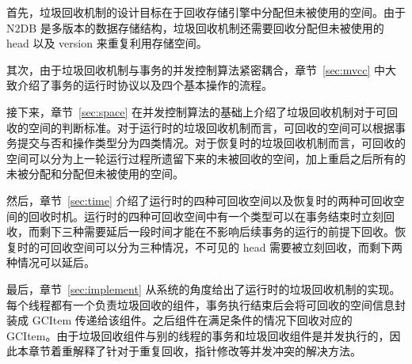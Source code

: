 首先，垃圾回收机制的设计目标在于回收存储引擎中分配但未被使用的空间。由于 N2DB 是多版本的数据存储结构，垃圾回收机制还需要回收分配但未被使用的 head 以及 version 来重复利用存储空间。

其次，由于垃圾回收机制与事务的并发控制算法紧密耦合，章节~\ref{sec:mvcc} 中大致介绍了事务的运行时协议以及四个基本操作的流程。

接下来，章节~\ref{sec:space} 在并发控制算法的基础上介绍了垃圾回收机制对于可回收的空间的判断标准。对于运行时的垃圾回收机制而言，可回收的空间可以根据事务提交与否和操作类型分为四类情况。对于恢复时的垃圾回收机制而言，可回收的空间可以分为上一轮运行过程所遗留下来的未被回收的空间，加上重启之后所有的未被分配和分配但未被使用的空间。

然后，章节~\ref{sec:time} 介绍了运行时的四种可回收空间以及恢复时的两种可回收空间的回收时机。运行时的四种可回收空间中有一个类型可以在事务结束时立刻回收，而剩下三种需要延后一段时间才能在不影响后续事务的运行的前提下回收。恢复时的可回收空间可以分为三种情况，不可见的 head 需要被立刻回收，而剩下两种情况可以延后。

最后，章节~\ref{sec:implement} 从系统的角度给出了运行时的垃圾回收机制的实现。每个线程都有一个负责垃圾回收的组件，事务执行结束后会将可回收的空间信息封装成 GCItem 传递给该组件。之后组件在满足条件的情况下回收对应的 GCItem。由于垃圾回收组件与别的线程的事务和垃圾回收组件是并发执行的，因此本章节着重解释了针对于重复回收，指针修改等并发冲突的解决方法。
